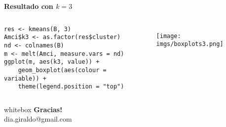 \documentclass[10pt, aspectratio=169]{beamer}
\begin{document}
{
\begin{frame}[fragile]{}
\vspace{0.3cm}
\textcolor{UltraViolet}{\textbf{\large Resultado con $k=3$}} 
\begin{columns}
{\small
 \begin{verbatim}
res <- kmeans(B, 3)
Amci$k3 <- as.factor(res$cluster)
nd <- colnames(B)
m <- melt(Amci, measure.vars = nd)
ggplot(m, aes(k3, value)) + 
    geom_boxplot(aes(colour = variable)) + 
    theme(legend.position = "top")
\end{verbatim}}
 \pause
 \begin{figure}
 \texttt{[image: imgs/boxplots3.png]}
\end{figure}
\end{columns}
\end{frame}
}

{
\begin{frame}[plain]
\begin{overlayarea}{0.9\textwidth}{9cm}
 \begin{columns}
  \vspace{6cm}
\begin{beamercolorbox}[sep=2mm]{whitebox}
 \textbf{\Huge Gracias!}\\
 \vspace{0.2cm}
 dia.giraldo@gmail.com
\end{beamercolorbox}
 \end{columns}
\end{overlayarea}
\end{frame}
}


% 
% 
\end{document}
